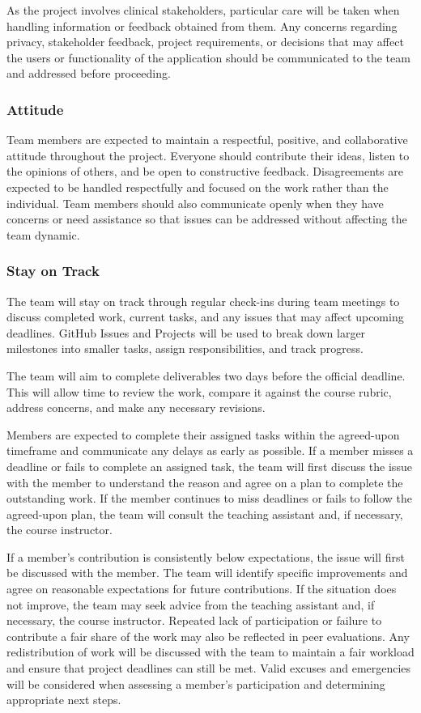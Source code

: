 \documentclass{article}
\begin{document}
As the project involves clinical stakeholders, particular care will be taken when handling information
or feedback obtained from them. Any concerns regarding privacy, stakeholder feedback, project requirements,
or decisions that may affect the users or functionality of the application should be communicated to the team
and addressed before proceeding.

\subsubsection*{Attitude}

Team members are expected to maintain a respectful, positive, and collaborative attitude throughout the project.
Everyone should contribute their ideas, listen to the opinions of others, and be open to constructive feedback.
Disagreements are expected to be handled respectfully and focused on the work rather than the individual.
Team members should also communicate openly when they have concerns or need assistance so that issues can
be addressed without affecting the team dynamic.

\subsubsection*{Stay on Track}

The team will stay on track through regular check-ins during team meetings to discuss completed work,
current tasks, and any issues that may affect upcoming deadlines. GitHub Issues and Projects will be
used to break down larger milestones into smaller tasks, assign responsibilities, and track progress.

The team will aim to complete deliverables two days before the official deadline. This will allow time
to review the work, compare it against the course rubric, address concerns, and make any necessary revisions.

Members are expected to complete their assigned tasks within the agreed-upon timeframe and communicate
any delays as early as possible. If a member misses a deadline or fails to complete an assigned task,
the team will first discuss the issue with the member to understand the reason and agree on a plan
to complete the outstanding work. If the member continues to miss deadlines or fails to follow the
agreed-upon plan, the team will consult the teaching assistant and, if necessary, the course instructor.

If a member's contribution is consistently below expectations, the issue will first be discussed
with the member. The team will identify specific improvements and agree on reasonable expectations
for future contributions. If the situation does not improve, the team may seek advice from the
teaching assistant and, if necessary, the course instructor. Repeated lack of participation or
failure to contribute a fair share of the work may also be reflected in peer evaluations.
Any redistribution of work will be discussed with the team to maintain a fair workload and
ensure that project deadlines can still be met. Valid excuses and emergencies will be considered
when assessing a member's participation and determining appropriate next steps.
\end{document}
